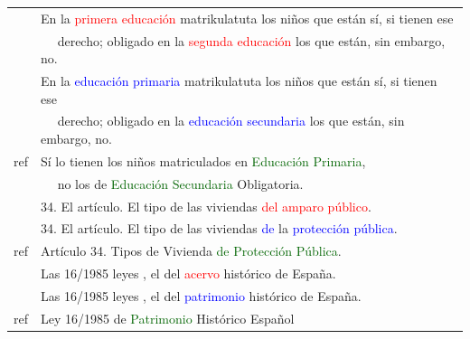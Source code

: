 \documentclass[25pt, a0paper, portrait, margin=0mm, innermargin=15mm,blockverticalspace=15mm, colspace=15mm, subcolspace=8mm]{tikzposter}
\begin{document}
\begin{columns}
{\begin{center}
\begin{tabular}{|l|l|}
& En la \textcolor{red}{primera educación} matrikulatuta los niños que están sí, si tienen ese  \\ 
& ~~ derecho; obligado en la \textcolor{red}{segunda educación} los que están, sin embargo, no.  \\  %
& En la \textcolor{blue}{educación primaria} matrikulatuta los niños que están sí, si tienen ese  \\ 
& ~~ derecho; obligado en la \textcolor{blue}{educación secundaria} los que están, sin embargo, no. \\  %
{\sc ref} & Sí lo tienen los niños matriculados en \textcolor{darkgreen}{Educación Primaria}, \\
    &~~ no los de \textcolor{darkgreen}{Educación Secundaria} Obligatoria.\\
\hline

& 34. El artículo. El tipo de las viviendas \textcolor{red}{del amparo público}. \\ %
& 34. El artículo. El tipo de las viviendas \textcolor{blue}{de} la \textcolor{blue}{protección pública}. \\ %
{\sc ref} & Artículo 34. Tipos de Vivienda \textcolor{darkgreen}{de Protección Pública}.\\
\hline
& Las 16/1985 leyes , el del \textcolor{red}{acervo} histórico de España. \\ %
& Las 16/1985 leyes , el del \textcolor{blue}{patrimonio} histórico de España.  \\ %
{\sc ref} & Ley 16/1985 de \textcolor{darkgreen}{Patrimonio} Histórico Español \\
\hline
\end{tabular}
\end{center}



}


\end{columns}
\end{document}
